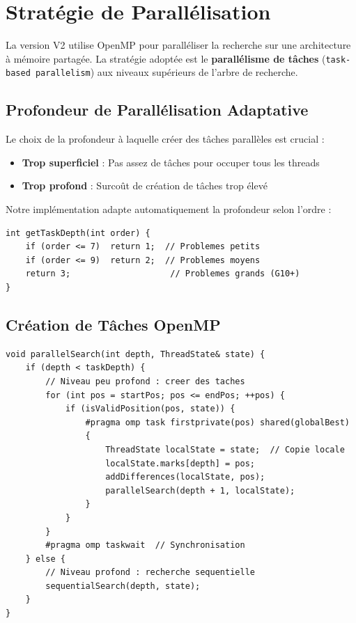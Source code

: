 \documentclass[12pt,a4paper,twoside]{report}
\begin{document}
\section{Stratégie de Parallélisation}

La version V2 utilise OpenMP pour paralléliser la recherche sur une architecture à mémoire partagée. La stratégie adoptée est le \textbf{parallélisme de tâches} (\texttt{task-based parallelism}) aux niveaux supérieurs de l'arbre de recherche.

\subsection{Profondeur de Parallélisation Adaptative}

Le choix de la profondeur à laquelle créer des tâches parallèles est crucial :
\begin{itemize}
    \item \textbf{Trop superficiel} : Pas assez de tâches pour occuper tous les threads
    \item \textbf{Trop profond} : Surcoût de création de tâches trop élevé
\end{itemize}

Notre implémentation adapte automatiquement la profondeur selon l'ordre :

\begin{lstlisting}[caption={Profondeur de parallélisation adaptative}]
int getTaskDepth(int order) {
    if (order <= 7)  return 1;  // Problemes petits
    if (order <= 9)  return 2;  // Problemes moyens
    return 3;                    // Problemes grands (G10+)
}
\end{lstlisting}

\subsection{Création de Tâches OpenMP}

\begin{lstlisting}[caption={Boucle principale avec création de tâches}]
void parallelSearch(int depth, ThreadState& state) {
    if (depth < taskDepth) {
        // Niveau peu profond : creer des taches
        for (int pos = startPos; pos <= endPos; ++pos) {
            if (isValidPosition(pos, state)) {
                #pragma omp task firstprivate(pos) shared(globalBest)
                {
                    ThreadState localState = state;  // Copie locale
                    localState.marks[depth] = pos;
                    addDifferences(localState, pos);
                    parallelSearch(depth + 1, localState);
                }
            }
        }
        #pragma omp taskwait  // Synchronisation
    } else {
        // Niveau profond : recherche sequentielle
        sequentialSearch(depth, state);
    }
}
\end{lstlisting}
\end{document}
